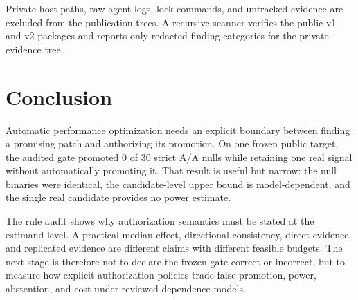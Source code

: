 \documentclass[10pt]{article}
\begin{document}
Private host paths, raw agent logs, lock commands, and untracked evidence are
excluded from the publication trees.  A recursive scanner verifies the public
v1 and v2 packages and reports only redacted finding categories for the private
evidence tree.

\section{Conclusion}

Automatic performance optimization needs an explicit boundary between finding
a promising patch and authorizing its promotion.  On one frozen public target,
the audited gate promoted 0 of 30 strict A/A nulls while retaining one real
signal without automatically promoting it.  That result is useful but narrow:
the null binaries were identical, the candidate-level upper bound is
model-dependent, and the single real candidate provides no power estimate.

The rule audit shows why authorization semantics must be stated at the estimand
level.  A practical median effect, directional consistency, direct evidence,
and replicated evidence are different claims with different feasible budgets.
The next stage is therefore not to declare the frozen gate correct or incorrect,
but to measure how explicit authorization policies trade false promotion,
power, abstention, and cost under reviewed dependence models.



\end{document}
